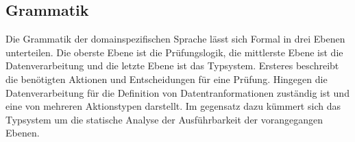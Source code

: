 \documentclass{article}
\begin{document}
    \subsection{Grammatik}
    \label{BNF}
    Die Grammatik der domainspezifischen Sprache lässt sich Formal in drei Ebenen unterteilen. 
    Die oberste Ebene ist die Prüfungslogik, die mittlerste Ebene ist die Datenverarbeitung und die letzte Ebene ist das Typsystem. \cite{99}
    Ersteres beschreibt die benötigten Aktionen und Entscheidungen für eine Prüfung. \cite{99}
    Hingegen die Datenverarbeitung für die Definition von Datentranformationen zuständig ist und eine von mehreren Aktionstypen darstellt. \cite{99}
    Im gegensatz dazu kümmert sich das Typsystem um die statische Analyse der Ausführbarkeit der vorangegangen Ebenen. \cite{99}
\end{document}
